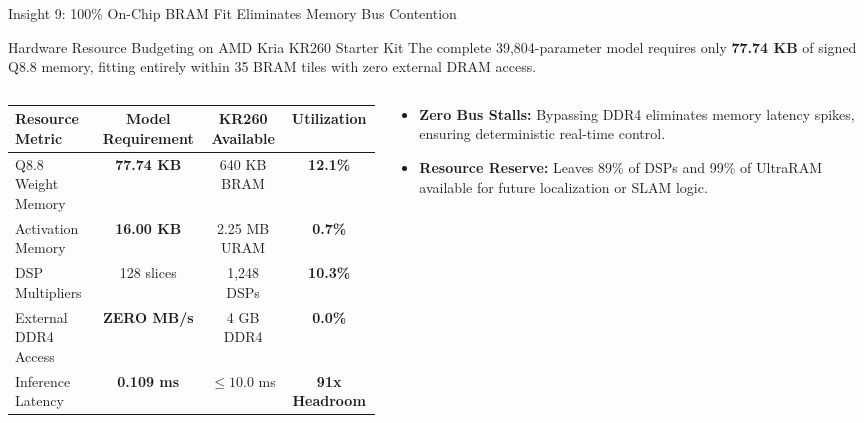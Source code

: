 \documentclass[aspectratio=169, 10pt]{beamer}
\begin{document}
\begin{frame}{Insight 9: 100\% On-Chip BRAM Fit Eliminates Memory Bus Contention}
  \begin{block}{Hardware Resource Budgeting on AMD Kria KR260 Starter Kit}
    The complete 39,804-parameter model requires only \textbf{77.74 KB} of signed Q8.8 memory, fitting entirely within 35 BRAM tiles with zero external DRAM access.
  \end{block}
  \vspace{-0.2cm}
  \begin{columns}[T]
    \begin{column}{0.52\textwidth}
      \setlength{\tabcolsep}{2pt}
      \begin{table}
        \centering
        \scriptsize
        \begin{tabular}{lccc}
          \toprule
          \textbf{Resource Metric} & \textbf{Model Requirement} & \textbf{KR260 Available} & \textbf{Utilization} \\
          \midrule
          Q8.8 Weight Memory & \textbf{77.74 KB} & 640 KB BRAM & \textbf{12.1\%} \\
          Activation Memory & \textbf{16.00 KB} & 2.25 MB URAM & \textbf{0.7\%} \\
          DSP Multipliers & 128 slices & 1,248 DSPs & \textbf{10.3\%} \\
          External DDR4 Access & \textbf{ZERO MB/s} & 4 GB DDR4 & \textbf{0.0\%} \\
          Inference Latency & \textbf{0.109 ms} & $\le 10.0$ ms & \textbf{91x Headroom} \\
          \bottomrule
        \end{tabular}
      \end{table}
    \end{column}
    \begin{column}{0.44\textwidth}
      \begin{itemize}
        \item \textbf{Zero Bus Stalls:} Bypassing DDR4 eliminates memory latency spikes, ensuring deterministic real-time control.
        \item \textbf{Resource Reserve:} Leaves 89\% of DSPs and 99\% of UltraRAM available for future localization or SLAM logic.
      \end{itemize}
    \end{column}
  \end{columns}
\end{frame}
\end{document}
